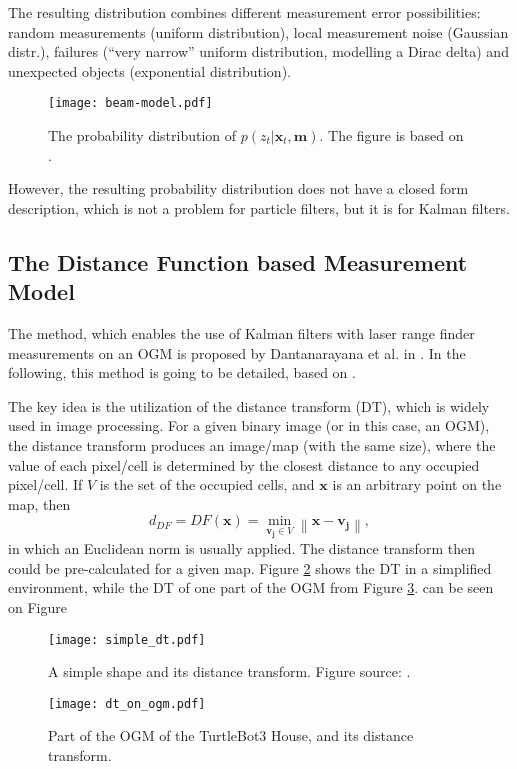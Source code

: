 The resulting distribution combines different measurement error possibilities:
random measurements (uniform distribution), local measurement noise (Gaussian distr.),
failures (``very narrow'' uniform distribution, modelling a Dirac delta) and unexpected
objects (exponential distribution).
\begin{figure}[htbp]
    \centering
    \texttt{[image: beam-model.pdf]}
    \caption{The probability distribution of $p(z_t | \mathbf{x}_t,\mathbf{m})$.
        The figure is based on \cite{Thrun2005}.}
    \label{fig:beam-model}
\end{figure}

However, the resulting probability distribution does not have a closed form description, which is
not a problem for particle filters, but it is for Kalman filters.

\subsection{The Distance Function based Measurement Model}
The method, which enables the use of Kalman filters with laser range finder measurements on an OGM is proposed
by Dantanarayana et al. in \cite{Dantanarayana2013,Dantanarayana2016}.
In the following, this method is going to be detailed, based on \cite{Dantanarayana2016b}.

The key idea is the utilization of the distance transform (DT), which is widely used in
image processing.
For a given binary image (or in this case, an OGM), the distance transform
produces an image/map (with the same size), where the value of each pixel/cell is
determined by the closest distance to any occupied pixel/cell.
If $V$ is the set of the occupied cells, and $\mathbf{x}$ is an arbitrary point on the map, then
\begin{equation}
    d_{D F}=D F(\mathbf{x})=\min _{\mathbf{v}_{\mathbf{j}} \in V}\left\|\mathbf{x}-\mathbf{v}_{\mathbf{j}}\right\|,
\end{equation}
in which an Euclidean norm is usually applied.
The distance transform then could be pre-calculated for a given map.
Figure \ref{fig:simple-dt} shows the DT in a simplified environment,
while the DT of one part of the OGM from Figure \ref{fig:gazebo-map-ogm-dt}. can be seen on Figure
\begin{figure}[htbp]
    \centering
    \texttt{[image: simple\_dt.pdf]}
    \caption{A simple shape and its distance transform. Figure source: \cite{Dantanarayana2016b}.}
    \label{fig:simple-dt}
\end{figure}
\begin{figure}[htbp]
    \centering
    \texttt{[image: dt\_on\_ogm.pdf]}
    \caption{Part of the OGM of the TurtleBot3 House, and its distance transform.}
    \label{fig:gazebo-map-ogm-dt}
\end{figure}

